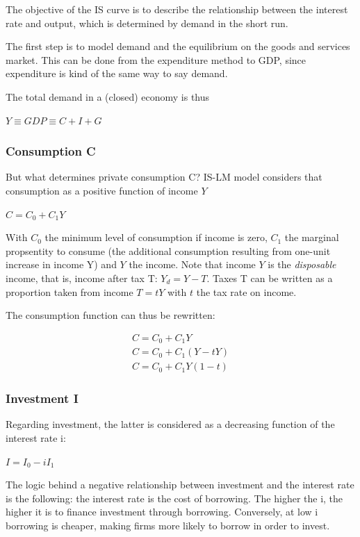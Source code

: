 \documentclass[
  letterpaper,
  DIV=11,
  numbers=noendperiod]{scrreprt}
\begin{document}
The objective of the IS curve is to describe the relationship between
the interest rate and output, which is determined by demand in the short
run.

The first step is to model demand and the equilibrium on the goods and
services market. This can be done from the expenditure method to GDP,
since expenditure is kind of the same way to say demand.

The total demand in a (closed) economy is thus

\(Y \equiv GDP \equiv C + I + G\)

\hypertarget{consumption-c}{%
\subsubsection{Consumption C}\label{consumption-c}}

But what determines private consumption C? IS-LM model considers that
consumption as a positive function of income \(Y\)

\(C = C_{0}+C_{1}Y\)

With \(C_{0}\) the minimum level of consumption if income is zero,
\(C_{1}\) the marginal propsentity to consume (the additional
consumption resulting from one-unit increase in income Y) and \(Y\) the
income. Note that income \(Y\) is the \emph{disposable} income, that is,
income after tax T: \(Y_d = Y-T\). Taxes T can be written as a
proportion taken from income \(T = tY\) with \(t\) the tax rate on
income.

The consumption function can thus be rewritten:

\[
\begin{aligned}
C = C_{0}+C_{1}Y
\\
C = C_{0} + C_{1}(Y-tY)
\\
C = C_{0} + C_{1}Y(1-t)
\end{aligned}
\]

\hypertarget{investment-i}{%
\subsubsection{Investment I}\label{investment-i}}

Regarding investment, the latter is considered as a decreasing function
of the interest rate i:

\(I = I_{0} -iI_{1}\)

The logic behind a negative relationship between investment and the
interest rate is the following: the interest rate is the cost of
borrowing. The higher the i, the higher it is to finance investment
through borrowing. Conversely, at low i borrowing is cheaper, making
firms more likely to borrow in order to invest.
\end{document}
